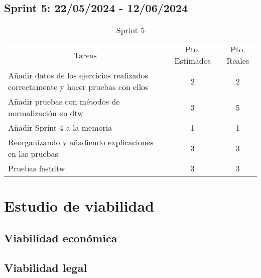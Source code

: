\subsection{Sprint 5: 22/05/2024 - 12/06/2024 }
\begin{table}[H]
	\begin{tabular}{lcc}
		\multicolumn{1}{c}{Tareas} & Pto. Estimados & Pto. Reales\\
	    Añadir datos de los ejercicios realizados correctamente y hacer pruebas con ellos & 2 & 2 \\
		Añadir pruebas con métodos de normalización en dtw & 3 & 5 \\
		Añadir Sprint 4 a la memoria & 1 &1 \\
		Reorganizando y añadiendo explicaciones en las pruebas & 3 & 3 \\
		Pruebas fastdtw & 3 & 3 \\
	\end{tabular}
	\caption{Sprint 5}
	\label{sprint5}
\end{table}

\section{Estudio de viabilidad}

\subsection{Viabilidad económica}

\subsection{Viabilidad legal}


